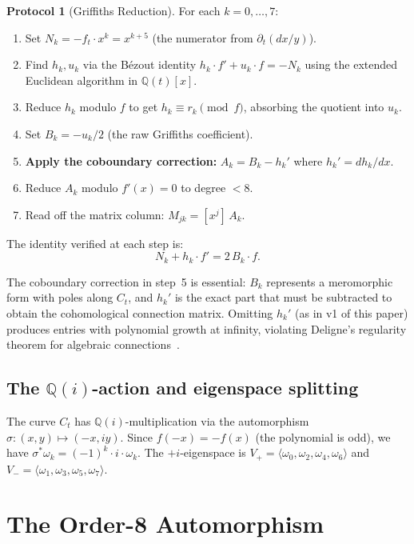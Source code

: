 \documentclass[11pt]{article}
\theoremstyle{plain}
\theoremstyle{definition}
\newtheorem{protocol}[theorem]{Protocol}
\theoremstyle{remark}
\newcommand{\Q}{\mathbb{Q}}
\begin{document}
\begin{protocol}[Griffiths Reduction]\label{prot:griffiths}
For each $k = 0,\ldots,7$:
\begin{enumerate}[nosep]
\item Set $N_k = -f_t \cdot x^k = x^{k+5}$ (the numerator from
  $\partial_t(dx/y)$).
\item Find $h_k, u_k$ via the B\'ezout identity $h_k \cdot f' + u_k
  \cdot f = -N_k$ using the extended Euclidean algorithm in $\Q(t)[x]$.
\item Reduce $h_k$ modulo $f$ to get $h_k \equiv r_k \pmod{f}$,
  absorbing the quotient into $u_k$.
\item Set $B_k = -u_k/2$ (the raw Griffiths coefficient).
\item \textbf{Apply the coboundary correction:} $A_k = B_k - h_k'$
  where $h_k' = dh_k/dx$.
\item Reduce $A_k$ modulo $f'(x) = 0$ to degree $< 8$.
\item Read off the matrix column: $M_{jk} = [x^j]\, A_k$.
\end{enumerate}
The identity verified at each step is:
\begin{equation}\label{eq:griffiths-id}
  N_k + h_k \cdot f' = 2\, B_k \cdot f.
\end{equation}
\end{protocol}

The coboundary correction in step~5 is essential: $B_k$ represents a
meromorphic form with poles along $C_t$, and $h_k'$ is the exact part
that must be subtracted to obtain the cohomological connection matrix.
Omitting $h_k'$ (as in v1 of this paper) produces entries with
polynomial growth at infinity, violating Deligne's regularity theorem
for algebraic connections~\cite{Deligne1971}.

\subsection{The $\Q(i)$-action and eigenspace splitting}\label{sec:Qi}

The curve $C_t$ has $\Q(i)$-multiplication via the automorphism
$\sigma\colon (x,y) \mapsto (-x, iy)$. Since $f(-x) = -f(x)$
(the polynomial is odd), we have $\sigma^* \omega_k = (-1)^k \cdot i
\cdot \omega_k$. The $+i$-eigenspace is
$V_+ = \langle\omega_0, \omega_2, \omega_4, \omega_6\rangle$
and $V_- = \langle\omega_1, \omega_3, \omega_5, \omega_7\rangle$.

\section{The Order-8 Automorphism}\label{sec:automorphism}
\end{document}
